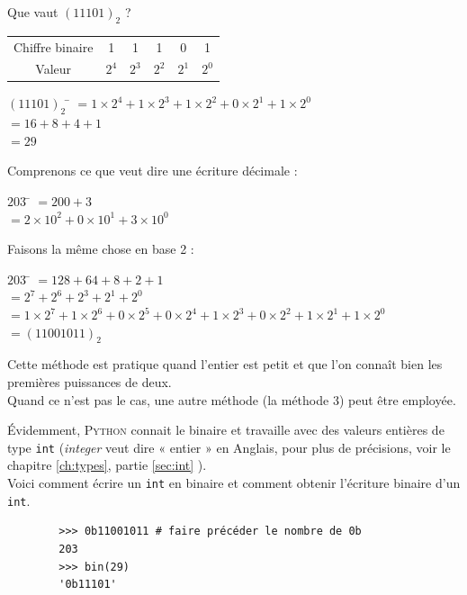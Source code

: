 \begin{methode}
    Que vaut $(11101)_2$ ?
    \begin{center}
        \alternaterowcolors[UGLiPurple]
        \begin{tabular}{CCCCCC}
            Chiffre binaire & 1     & 1     & 1     & 0     & 1     \\
            Valeur          & $2^4$ & $2^3$ & $2^2$ & $2^1$ & $2^0$ \\
        \end{tabular}
    \end{center}
    \begin{tabbing}
        $(11101)_2$	\= 	$=1\times 2^4+1\times 2^3+1\times 2^2+0\times 2^1+1\times 2^0$	\\
        \>	$=16+8+4+1$	\\
        \>	$=29$
    \end{tabbing}\nopagebreak
\end{methode}

\begin{methode}
    Comprenons ce que veut dire une écriture décimale :
    \begin{tabbing}
        $203$	\= 	$=200+3$	\\

        \>	$=2\times 10^2+0\times 10^1+3\times 10^0$
    \end{tabbing}
    Faisons la même chose en base 2 :
    \begin{tabbing}
        $203$	\= 	$=128+64+8+2+1$	\\

        \>	$=2^7+2^6+2^3+2^1+2^0$	\\

        \>	$=1\times 2^7+1\times 2^6+0\times 2^5 + 0\times 2^4 +1\times 2^3+0\times 2^2 + 1\times
            2^1+1\times 2^0$	\\

        \> $=(11001011)_2$
    \end{tabbing}
    Cette méthode est pratique quand l'entier est petit et que l'on connaît bien les premières puissances de deux.\\
    Quand ce n'est pas le cas, une autre méthode (la méthode 3) peut être employée.

\end{methode}
\'Evidemment, \textsc{Python} connait le binaire et travaille avec des valeurs entières de type \texttt{int} (\textit{integer} veut dire « entier » en Anglais, pour plus de précisions, voir le chapitre \ref{ch:types}, partie \ref{sec:int} ).\\
Voici comment écrire un \texttt{int} en binaire et comment obtenir l'écriture
binaire d'un \texttt{int}.
\begin{pys}
    \begin{verbatim}
        >>> 0b11001011 # faire précéder le nombre de 0b
        203
        >>> bin(29)
        '0b11101'
    \end{verbatim}
\end{pys}

